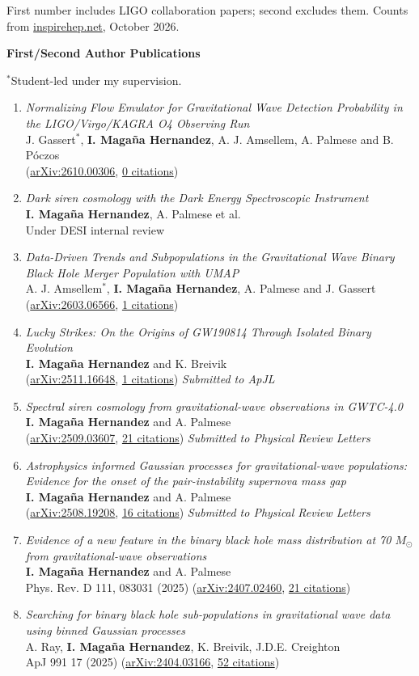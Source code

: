 \documentclass[letterpaper,10pt]{article}
\newcommand{\resheadingAuthor}[1]{{\large \colorbox{mygrey}{\begin{minipage}{\dimexpr\textwidth-2\fboxsep\relax}{\textbf{#1 \vphantom{p\^{E}}}}\end{minipage}}}\vspace{7pt}}
\newcommand{\publicationArxiv}[5]{%
\emph{#1}\\
#2\\
(\href{#3}{#4}, \underline{#5 citations})}
\newcommand{\publicationArxivNew}[4]{%
\emph{#1}\\
#2\\
#4}
\newcommand{\publicationJournal}[6]{%
\emph{#1}\\
#2\\
#3 (\href{#4}{#5}, \underline{#6 citations})}
\newcommand{\publicationJournalComment}[7]{%
\emph{#1}\\
#2\\
#3 (\href{#4}{#5}, \underline{#6 citations}) \emph{Submitted to #7}}
\begin{document}
{\small First number includes LIGO collaboration papers; second excludes them. Counts from \href{https://inspirehep.net/}{inspirehep.net}, October 2026.}

\resheadingAuthor{First/Second Author Publications}

{\small $^*$Student-led under my supervision.}

\begin{enumerate}
\item 
    \publicationArxiv{Normalizing Flow Emulator for Gravitational Wave Detection Probability in the LIGO/Virgo/KAGRA O4 Observing Run}
    {J. Gassert$^*$, \textbf{I. Maga\~na Hernandez}, A. J. Amsellem, A. Palmese and B. P\'oczos}
    {https://arxiv.org/abs/2610.00306}{arXiv:2610.00306}{0}
\item 
    \publicationArxivNew{Dark siren cosmology with the Dark Energy Spectroscopic Instrument}{\textbf{I. Maga\~na Hernandez}, A. Palmese et al.}{}{Under DESI internal review}
\item 
    \publicationArxiv{Data-Driven Trends and Subpopulations in the Gravitational Wave Binary Black Hole Merger Population with UMAP}
    {A. J. Amsellem$^*$, \textbf{I. Maga\~na Hernandez}, A. Palmese and J. Gassert}
    {https://arxiv.org/abs/2603.06566}{arXiv:2603.06566}{1}
\item 
    \publicationJournalComment{Lucky Strikes: On the Origins of GW190814 Through Isolated Binary Evolution}{\textbf{I. Maga\~na Hernandez} and K. Breivik}{}{https://arxiv.org/abs/2511.16648}{arXiv:2511.16648}{1}{ApJL}
\item 
    \publicationJournalComment{Spectral siren cosmology from gravitational-wave observations in GWTC-4.0}{\textbf{I. Maga\~na Hernandez} and A. Palmese}{}{https://arxiv.org/abs/2509.03607}{arXiv:2509.03607}{21}{Physical Review Letters}
\item 
    \publicationJournalComment{Astrophysics informed Gaussian processes for gravitational-wave populations: Evidence for the onset of the pair-instability supernova mass gap}{\textbf{I. Maga\~na Hernandez} and A. Palmese}{}{https://arxiv.org/abs/2508.19208}{arXiv:2508.19208}{16}{Physical Review Letters}
\item 
    \publicationJournal{Evidence of a new feature in the binary black hole mass distribution at 70 $M_\odot$ from gravitational-wave observations}{\textbf{I. Maga\~na Hernandez} and A. Palmese}{Phys. Rev. D 111, 083031 (2025)}{https://arxiv.org/abs/2407.02460}{arXiv:2407.02460}{21}
\item 
    \publicationJournal{Searching for binary black hole sub-populations in gravitational wave data using binned Gaussian processes}{A. Ray, \textbf{I. Maga\~na Hernandez}, K. Breivik, J.D.E. Creighton}{ApJ 991 17 (2025)}{https://arxiv.org/abs/2404.03166}{arXiv:2404.03166}{52}

\end{enumerate}
\end{document}
